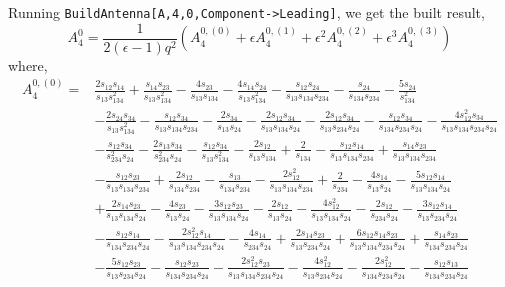Running \texttt{BuildAntenna[A,4,0,Component->Leading]}, we get the built result,
\begin{equation}
    A_4^0 = \frac{1}{2(\epsilon-1)q^2}\!\left(A_4^{0,(0)}+\epsilon A_4^{0,(1)} + \epsilon^2 A_4^{0,(2)} + \epsilon^3 A_4^{0,(3)}\right)
\end{equation}
where,
\begin{align}
    A_4^{0,(0)} = {}
        & \frac{2s_{12}s_{14}}{s_{13}s_{134}^2} + \frac{s_{14}s_{23}}{s_{13}s_{134}^2} - \frac{4s_{23}}{s_{13}s_{134}} - \frac{4s_{14}s_{24}}{s_{13}s_{134}^2} - \frac{s_{12}s_{24}}{s_{13}s_{134}s_{234}} - \frac{s_{24}}{s_{134}s_{234}} - \frac{5s_{24}}{s_{134}^2} \nonumber \\
        & - \frac{2s_{24}s_{34}}{s_{13}s_{134}^2} - \frac{s_{12}s_{34}}{s_{13}s_{134}s_{234}} - \frac{2s_{34}}{s_{13}s_{24}} - \frac{2s_{12}s_{34}}{s_{13}s_{134}s_{24}} - \frac{2s_{12}s_{34}}{s_{13}s_{234}s_{24}} - \frac{s_{12}s_{34}}{s_{134}s_{234}s_{24}} - \frac{4s_{12}^2s_{34}}{s_{13}s_{134}s_{234}s_{24}} \nonumber \\
        & - \frac{s_{12}s_{34}}{s_{234}^2s_{24}} - \frac{2s_{13}s_{34}}{s_{234}^2s_{24}} - \frac{s_{12}s_{34}}{s_{13}s_{134}^2} - \frac{2s_{12}}{s_{13}s_{134}} + \frac{2}{s_{134}} - \frac{s_{12}s_{14}}{s_{13}s_{134}s_{234}} + \frac{s_{14}s_{23}}{s_{13}s_{134}s_{234}} \nonumber \\
        & - \frac{s_{12}s_{23}}{s_{13}s_{134}s_{234}} + \frac{2s_{12}}{s_{134}s_{234}} - \frac{s_{13}}{s_{134}s_{234}} - \frac{2s_{12}^2}{s_{13}s_{134}s_{234}} + \frac{2}{s_{234}} - \frac{4s_{14}}{s_{13}s_{24}} - \frac{5s_{12}s_{14}}{s_{13}s_{134}s_{24}} \nonumber \\
        & + \frac{2s_{14}s_{23}}{s_{13}s_{134}s_{24}} - \frac{4s_{23}}{s_{13}s_{24}} - \frac{3s_{12}s_{23}}{s_{13}s_{134}s_{24}} - \frac{2s_{12}}{s_{13}s_{24}} - \frac{4s_{12}^2}{s_{13}s_{134}s_{24}} - \frac{2s_{12}}{s_{234}s_{24}} - \frac{3s_{12}s_{14}}{s_{13}s_{234}s_{24}} \nonumber \\
        & - \frac{s_{12}s_{14}}{s_{134}s_{234}s_{24}} - \frac{2s_{12}^2s_{14}}{s_{13}s_{134}s_{234}s_{24}} - \frac{4s_{14}}{s_{234}s_{24}} + \frac{2s_{14}s_{23}}{s_{13}s_{234}s_{24}} + \frac{6s_{12}s_{14}s_{23}}{s_{13}s_{134}s_{234}s_{24}} + \frac{s_{14}s_{23}}{s_{134}s_{234}s_{24}} \nonumber \\
        & - \frac{5s_{12}s_{23}}{s_{13}s_{234}s_{24}} - \frac{s_{12}s_{23}}{s_{134}s_{234}s_{24}} - \frac{2s_{12}^2s_{23}}{s_{13}s_{134}s_{234}s_{24}} - \frac{4s_{12}^2}{s_{13}s_{234}s_{24}} - \frac{2s_{12}^2}{s_{134}s_{234}s_{24}} - \frac{s_{12}s_{13}}{s_{134}s_{234}s_{24}} \nonumber \\

\end{align}
